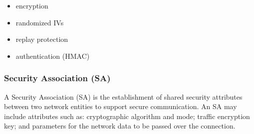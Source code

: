 \documentclass[english, leagacyboxes, nologo]{latex4ei/latex4ei_sheet}
\begin{document}
{  \begin{itemize}
  \item encryption
  \item randomized IVs
  \item replay protection
  \item authentication (HMAC)
  \end{itemize}

  \subsubsection{Security Association (SA)}
  A Security Association (SA) is the establishment of shared security attributes between two network entities to support secure communication. An SA may include attributes such as: cryptographic algorithm and mode; traffic encryption key; and parameters for the network data to be passed over the connection.
  }  
\end{document}
